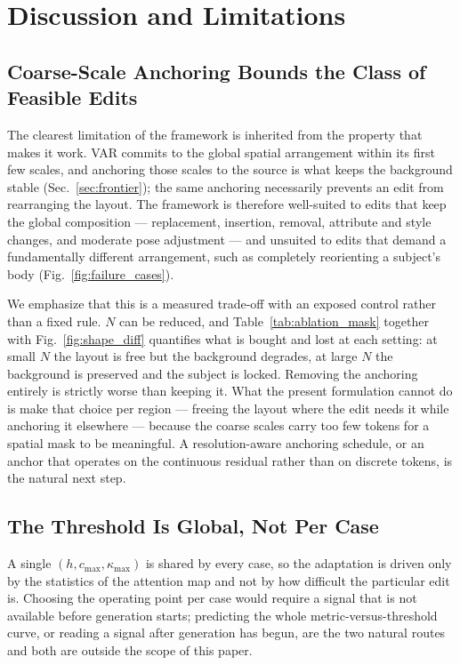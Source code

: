 \section{Discussion and Limitations}
\label{sec:limitations}

\subsection{Coarse-Scale Anchoring Bounds the Class of Feasible Edits}

The clearest limitation of the framework is inherited from the property that
makes it work. VAR commits to the global spatial arrangement within its first few
scales, and anchoring those scales to the source is what keeps the background
stable (Sec.~\ref{sec:frontier}); the same anchoring necessarily
prevents an edit from rearranging the layout. The framework is therefore
well-suited to edits that keep the global composition --- replacement,
insertion, removal, attribute and style changes, and moderate pose adjustment ---
and unsuited to edits that demand a fundamentally different arrangement, such as
completely reorienting a subject's body (Fig.~\ref{fig:failure_cases}).

We emphasize that this is a measured trade-off with an exposed control rather
than a fixed rule. $N$ can be reduced, and Table~\ref{tab:ablation_mask} together
with Fig.~\ref{fig:shape_diff} quantifies what is bought and lost at each
setting: at small $N$ the layout is free but the background degrades, at large
$N$ the background is preserved and the subject is locked. Removing the anchoring
entirely is strictly worse than keeping it. What
the present formulation cannot do is make that choice per region --- freeing the
layout where the edit needs it while anchoring it elsewhere --- because the
coarse scales carry too few tokens for a spatial mask to be meaningful. A
resolution-aware anchoring schedule, or an anchor that operates on the continuous
residual rather than on discrete tokens, is the natural next step.

\subsection{The Threshold Is Global, Not Per Case}

A single $(h, c_{\max}, \kappa_{\max})$ is shared by every case, so the adaptation is driven only by the statistics of the attention map and not by how difficult the particular edit is. Choosing the operating point per case would require a signal that is not available before generation starts; predicting the whole metric-versus-threshold curve, or reading a signal after generation has begun, are the two natural routes and both are outside the scope of this paper.

